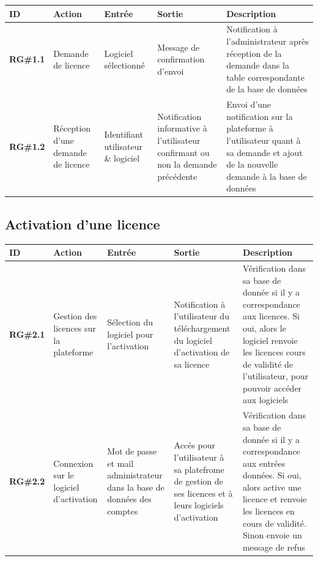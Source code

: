 \begin{table}[!h] %
    \small
    \begin{tabular}{
        |>{\raggedright\arraybackslash}m{1.5cm}
        |>{\raggedright\arraybackslash}m{1.9cm}
        |>{\raggedright\arraybackslash}m{2.5cm}
        |>{\raggedright\arraybackslash}m{2.5cm}
        |>{\raggedright\arraybackslash}m{7cm}
        |}
	\hline
	    \textbf{ID} & \textbf{Action} & \textbf{Entrée} & \textbf{Sortie} & \textbf{Description} \\
	\hline
	    \textbf{RG\#1.1} & Demande de licence & Logiciel sélectionné & Message de confirmation  d'envoi & Notification à l'administrateur après réception de la demande dans la table correspondante de la base de données \\
	\hline
	    \textbf{RG\#1.2} & Réception d'une  demande de  licence & Identifiant utilisateur \& logiciel & Notification informative à l'utilisateur  confirmant ou  non la demande  précédente & Envoi d'une notification sur la plateforme à l'utilisateur quant à sa demande et ajout de la nouvelle demande à la base de données\\
	\hline
    \end{tabular}
\end{table}

\subsection{Activation d'une licence}

\begin{table}[!h] %
    \small
    \begin{tabular}{
        |>{\raggedright\arraybackslash}m{1.5cm}
        |>{\raggedright\arraybackslash}m{1.9cm}
        |>{\raggedright\arraybackslash}m{2.5cm}
        |>{\raggedright\arraybackslash}m{2.5cm}
        |>{\raggedright\arraybackslash}m{7cm}
        |}
	\hline
	    \textbf{ID} & \textbf{Action} & \textbf{Entrée} & \textbf{Sortie} & \textbf{Description} \\
	\hline
	    \textbf{RG\#2.1} & Gestion des licences sur la plateforme & Sélection du logiciel pour l'activation & Notification à l'utilisateur du téléchargement du logiciel d'activation de sa licence & Vérification dans sa base de donnée si il y a correspondance aux licences. Si oui, alors le logiciel renvoie les licences cours de validité de l'utilisateur, pour pouvoir accéder aux logiciels \\ 
	\hline
	    \textbf{RG\#2.2} & Connexion sur  le logiciel  d'activation &  Mot de passe et mail administrateur dans la base de données des comptes & Accés pour l'utilisateur à sa platefrome de gestion de ses licences et à leurs logiciels d'activation & Vérification dans sa base de donnée si il y a correspondance aux entrées données. Si oui, alors active une licence et renvoie les licences en cours de validité. Sinon envoie un message de refus \\ 
	\hline
    \end{tabular}
\end{table}
\newpage


